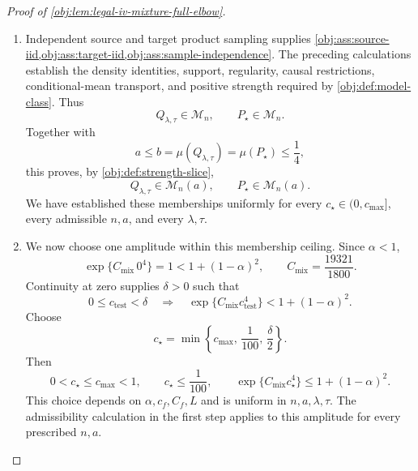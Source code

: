 \begin{proof}[Proof of \cref{obj:lem:legal-iv-mixture-full-elbow}]
\begin{enumerate}
Define the separation functional by
\[
J_n
=
h^2\int_0^1
\frac{B(t)^2}{1/4-h^2B(t)^2}\,dt.
\]
The reflection identity \(B(1-t)=-B(t)\) from \cref{obj:synth_16} implies
\[
\int_0^1
\frac{B(t)^3}{1/4-h^2B(t)^2}\,dt
=
-\int_0^1
\frac{B(t)^3}{1/4-h^2B(t)^2}\,dt
=0.
\]
Changing variables separately on each cell therefore gives
\[
\int_0^1\frac{u(x)^2}{1/4-u(x)^2}\,dx=J_n,
\qquad
\int_0^1\frac{u(x)^3}{1/4-u(x)^2}\,dx=0.
\]
Since \(v=\tau u\), the target complier-weighted outcome effect equals
\[
\begin{aligned}
\mathbb E_{Q_{\lambda,\tau}}[(Y(1)-Y(0))C\mid S=0]
&=-\tau\int_0^1
\left\{
\frac{u(x)^2}{1/4-u(x)^2}
+\frac{u(x)^3}{1/4-u(x)^2}
\right\}\,dx\\
&=-\tau J_n.
\end{aligned}
\]
Dividing by the positive target complier share gives
\[
\theta(Q_{\lambda,\tau})=-\frac{\tau J_n}{b}.
\]
In particular,
\[
J_n=-b\,\theta(Q_{\lambda,1}).
\]
For the center, the same calculations with zero perturbations give
\[
\mu(P_{\star})=b,\qquad \theta(P_{\star})=0.
\]

\item
Independent source and target product sampling supplies
\cref{obj:ass:source-iid,obj:ass:target-iid,obj:ass:sample-independence}.
The preceding calculations establish the density identities, support, regularity, causal restrictions, conditional-mean transport, and positive strength required by
\cref{obj:def:model-class}. Thus
\[
Q_{\lambda,\tau}\in\mathcal M_n,\qquad
P_{\star}\in\mathcal M_n.
\]
Together with
\[
a\le b=\mu(Q_{\lambda,\tau})=\mu(P_{\star})\le\frac14,
\]
this proves, by \cref{obj:def:strength-slice},
\[
Q_{\lambda,\tau}\in\mathcal M_n(a),
\qquad
P_{\star}\in\mathcal M_n(a).
\]
We have established these memberships uniformly for every
\(c_{\star}\in(0,c_{\max}]\), every admissible \(n,a\), and every \(\lambda,\tau\).

\item
We now choose one amplitude within this membership ceiling. Since \(\alpha<1\),
\[
\exp\{C_{\mathrm{mix}}\,0^4\}=1<1+(1-\alpha)^2,
\qquad
C_{\mathrm{mix}}=\frac{19321}{1800}.
\]
Continuity at zero supplies \(\delta>0\) such that
\[
0\le c_{\mathrm{test}}<\delta
\quad\Longrightarrow\quad
\exp\{C_{\mathrm{mix}}c_{\mathrm{test}}^4\}
<1+(1-\alpha)^2.
\]
Choose
\[
c_{\star}
=
\min\left\{c_{\max},\,\frac1{100},\,\frac{\delta}{2}\right\}.
\]
Then
\[
0<c_{\star}\le c_{\max}<1,\qquad
c_{\star}\le\frac1{100},\qquad
\exp\{C_{\mathrm{mix}}c_{\star}^4\}\le1+(1-\alpha)^2.
\]
This choice depends on \(\alpha,c_f,C_f,L\) and is uniform in \(n,a,\lambda,\tau\). The admissibility calculation in the first step applies to this amplitude for every prescribed \(n,a\).


\end{enumerate}
\end{proof}
